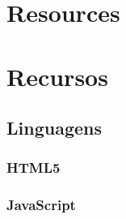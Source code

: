 %
%


\lang
{\chapter[Appendix A]{Resources}}
{\chapter[Apêndice A]{Recursos}}



 



%
\newpage

\section{Linguagens}
\subsection{HTML5}


\subsection{JavaScript}

